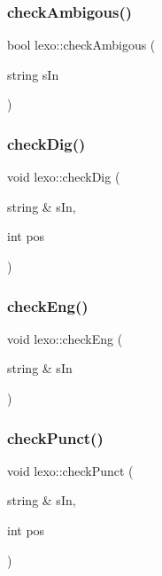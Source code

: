\mbox{\label{classlexo_ab8a61fb14f89b9e1c5e181f72d734af5}} 
\subsubsection{\texorpdfstring{check\+Ambigous()}{checkAmbigous()}}
{\footnotesize\ttfamily bool lexo\+::check\+Ambigous (\begin{DoxyParamCaption}\item[{string}]{s\+In }\end{DoxyParamCaption})}

\mbox{\label{classlexo_a5bbec0791966d024a09c6de4f12d278c}} 
\subsubsection{\texorpdfstring{check\+Dig()}{checkDig()}}
{\footnotesize\ttfamily void lexo\+::check\+Dig (\begin{DoxyParamCaption}\item[{string \&}]{s\+In,  }\item[{int}]{pos }\end{DoxyParamCaption})}

\mbox{\label{classlexo_ac52caed43b8e4660b8dfe662648f16f0}} 
\subsubsection{\texorpdfstring{check\+Eng()}{checkEng()}}
{\footnotesize\ttfamily void lexo\+::check\+Eng (\begin{DoxyParamCaption}\item[{string \&}]{s\+In }\end{DoxyParamCaption})}

\mbox{\label{classlexo_abc36453dc84f4ddb5f0aaaf6a59a7f56}} 
\subsubsection{\texorpdfstring{check\+Punct()}{checkPunct()}}
{\footnotesize\ttfamily void lexo\+::check\+Punct (\begin{DoxyParamCaption}\item[{string \&}]{s\+In,  }\item[{int}]{pos }\end{DoxyParamCaption})}

